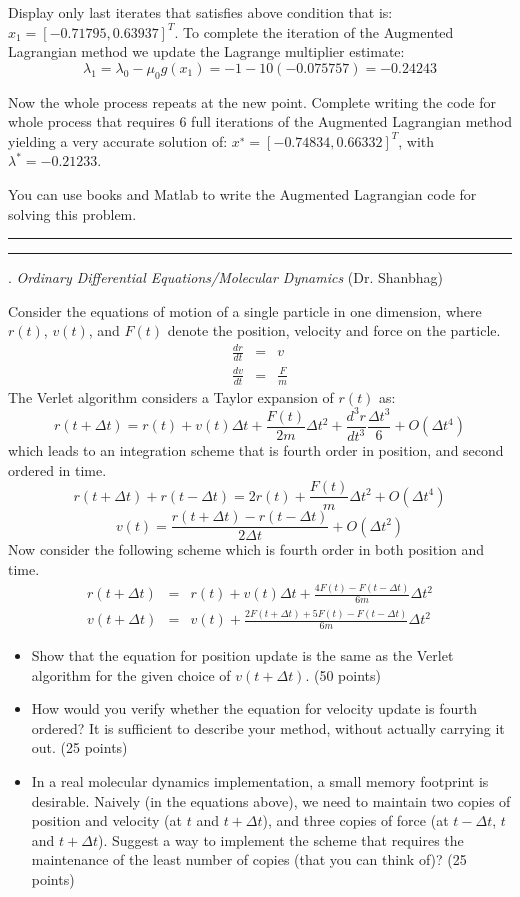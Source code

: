 \documentclass [11point]{article}
\begin{document}
\medskip
Display only last iterates that satisfies above condition that is: $x_1 = [-0.71795, 0.63937]^T$. To complete the iteration of the Augmented Lagrangian method we update the Lagrange multiplier estimate:
$$\lambda_1 =\lambda_0 - \mu_0 g(x_1 ) = -1 - 10(-0.075757) =-0.24243$$

Now the whole process repeats at the new point. Complete writing the code for whole process that requires 6 full iterations of the Augmented Lagrangian method yielding a very accurate solution
of: $x^∗ = [-0.74834, 0.66332]^T$, with $\lambda^* = -0.21233$.

\medskip
You can use books and Matlab to write the Augmented Lagrangian code for solving this problem.


\bigskip
\hrule \medskip


\pagebreak
\hrule 
{}. \textit{Ordinary Differential Equations/Molecular Dynamics} (Dr. Shanbhag)
\bigskip

Consider the equations of motion of a single particle in one dimension, where $r(t)$, $v(t)$, and $F(t)$ denote the position, velocity and force on the particle.
%
\begin{eqnarray*}
\frac{dr}{dt} & = & v \\
\frac{dv}{dt} & = & \frac{F}{m}
\end{eqnarray*}
%
The Verlet algorithm considers a Taylor expansion of $r(t)$ as:
$$r(t + \Delta t) = r(t) + v(t) \Delta t + \frac{F(t)}{2m} \Delta t^2 + \frac{d^3 r}{d t^3} \frac{\Delta t^3}{6} + O(\Delta t^4)$$
which leads to an integration scheme that is fourth order in position, and second ordered in time.
$$r(t + \Delta t) + r(t - \Delta t) = 2 r(t) + \frac{F(t)}{m} \Delta t^2 + O(\Delta t^4)$$
$$v(t) = \frac{r(t + \Delta t) - r(t - \Delta t)}{2 \Delta t} + O(\Delta t^2)$$
%
Now consider the following scheme which is fourth order in both position and time.
%
\begin{eqnarray*}
r(t+\Delta t) & = & r(t) + v(t) \Delta t + \frac{4F(t) - F(t- \Delta t)}{6m} \Delta t^2\\
v(t+\Delta t) & = & v(t) + \frac{2 F(t+ \Delta t) + 5F(t) - F(t- \Delta t)}{6m} \Delta t^2
\end{eqnarray*}

\begin{itemize}
\item Show that the equation for position update is the same as the Verlet algorithm for the given choice of $v(t+\Delta t)$. (50 points)
\item How would you verify whether the equation for velocity update is fourth ordered? It is sufficient to describe your method, without actually carrying it out. (25 points)
\item In a real molecular dynamics implementation, a small memory footprint is desirable. Naively (in the equations above), we need to maintain two copies of position and velocity (at $t$ and $t+\Delta t$), and three copies of force (at $t-\Delta t$, $t$ and $t+\Delta t$). Suggest a way to implement the scheme that requires the maintenance of the least number of copies (that you can think of)? (25 points)

\end{itemize}
\end{document}
